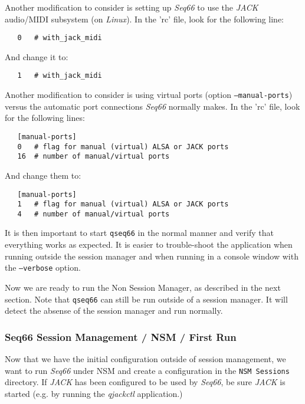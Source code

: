   Another modification to consider is setting up \textsl{Seq66} to use the
   \textsl{JACK} audio/MIDI subsystem (on \textsl{Linux}).
   In the 'rc' file, look for the following line:

\begin{verbatim}
   0   # with_jack_midi
\end{verbatim}

   And change it to:

\begin{verbatim}
   1   # with_jack_midi
\end{verbatim}

   Another modification to consider is using virtual ports (option
   \texttt{--manual-ports}) versus the automatic port connections
   \textsl{Seq66} normally makes.
   In the 'rc' file, look for the following lines:

\begin{verbatim}
   [manual-ports]
   0   # flag for manual (virtual) ALSA or JACK ports
   16  # number of manual/virtual ports
\end{verbatim}

   And change them to:

\begin{verbatim}
   [manual-ports]
   1   # flag for manual (virtual) ALSA or JACK ports
   4   # number of manual/virtual ports
\end{verbatim}

   It is then important to start \texttt{qseq66} in the normal manner and
   verify that everything works as expected.  It is easier to trouble-shoot the
   application when running outside the session manager and when running in a
   console window with the \texttt{--verbose} option.

   Now we are ready to run the Non Session Manager, as described in the next
   section.
   Note that \texttt{qseq66} can still be run outside of a
   session manager.  It will detect the absense of the session manager and run
   normally.

\subsubsection{Seq66 Session Management / NSM / First Run}
\label{subsec:sessions_nsm}

   Now that we have the initial configuration outside of session management, we
   want to run \textsl{Seq66} under NSM and create a configuration in the
   \texttt{NSM Sessions} directory.  If \textsl{JACK} has been configured to be
   used by \textsl{Seq66}, be sure \textsl{JACK} is started (e.g. by running
   the \textsl{qjackctl} application.)


